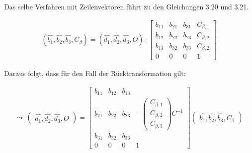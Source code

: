 	
Das selbe Verfahren mit Zeilenvektoren führt zu den Gleichungen 3.20 und 3.21.
	
%	
	

	\begin{gather}
	(\hat{b_1}, \hat{b_2}, \hat{b_3}, C_\beta) = (\hat{d_1},\hat{d_2}, \hat{d_3}, O) \cdot
	\begin{bmatrix} 
	b_{11} & b_{21} & b_{31} & C_{\beta,1}\\
	b_{12} & b_{22} & b_{23} & C_{\beta,2}\\
	b_{13} & b_{32} & b_{33} & C_{\beta,2}\\
	0           &       0       &   0         & 1   
	\end{bmatrix}
	\end{gather}	
	
	Daraus folgt, dass für den Fall der Rücktransformation gilt:
	
	\begin{gather}
	\leadsto \: \begin{pmatrix}
	\hat{d_1},\hat{d_2},\hat{d_3},O
	\end{pmatrix} = 
	\begin{bmatrix}
	b_{11} & b_{12} & b_{13} & \\
	b_{21} & b_{22} & b_{23} &  -\begin{pmatrix}
C_{\beta,1}\\
C_{\beta,2}\\
C_{\beta,3}
	\end{pmatrix}C^{-1}\\
	b_{31} & b_{32} & b_{33} & \\
	0&0&0 & 1
	\end{bmatrix}
	\begin{pmatrix}
	\hat{b_1},\hat{b_2},\hat{b_3},C_\beta
	\end{pmatrix}
	\end{gather}
	
